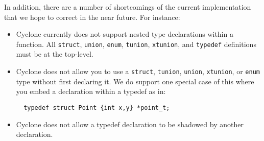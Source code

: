 In addition, there are a number of shortcomings of the current
implementation that we hope to correct in the near future.  For
instance:
\begin{itemize}
\item Cyclone currently does not support nested type declarations
  within a function. All \texttt{struct}, \texttt{union}, \texttt{enum},
  \texttt{tunion}, \texttt{xtunion}, and \texttt{typedef} definitions must
  be at the top-level.

\item Cyclone does not allow you to use a \texttt{struct}, \texttt{tunion},
  \texttt{union}, \texttt{xtunion}, or \texttt{enum} type without first
  declaring it.  We do support one special case of this where you embed
  a declaration within a typedef as in:
\begin{verbatim}
  typedef struct Point {int x,y} *point_t;
\end{verbatim}

\item Cyclone does not allow a typedef declaration to be shadowed by
another declaration.
\end{itemize}


